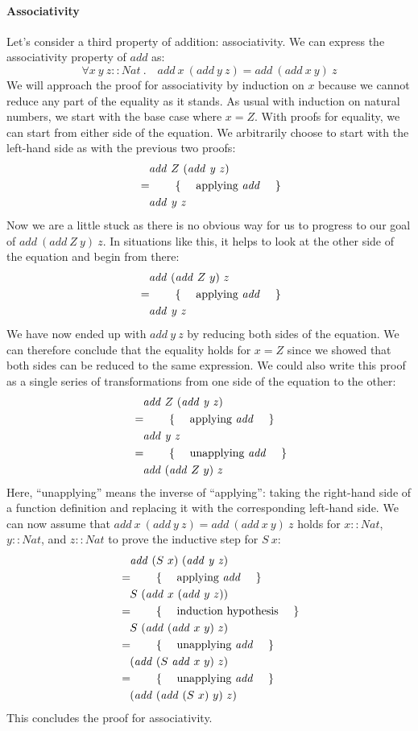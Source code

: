 \paragraph{Associativity} Let's consider a third property of addition: associativity. We can express the associativity property of $\mathit{add}$ as:
\begin{displaymath}
\forall x~y~z :: \mathit{Nat}~.\quad \mathit{add}~x~(\mathit{add~y~z}) = \mathit{add}~(\mathit{add}~x~y)~z
\end{displaymath}
We will approach the proof for associativity by induction on $x$ because we cannot reduce any part of the equality as it stands. As usual with induction on natural numbers, we start with the base case where $x = Z$. With proofs for equality, we can start from either side of the equation. We arbitrarily choose to start with the left-hand side as with the previous two proofs:
\begin{align*}
&\quad \mathit{add}~Z~(\mathit{add~y~z})\\
&=\qquad\text{\{\quad\ applying $\mathit{add}$ \quad\}}\\
&\quad \mathit{add~y~z}
\end{align*}
Now we are a little stuck as there is no obvious way for us to progress to our goal of $\mathit{add}~(\mathit{add}~Z~y)~z$. In situations like this, it helps to look at the other side of the equation and begin from there:
\begin{align*}
&\quad \mathit{add}~(\mathit{add}~Z~y)~z\\
&=\qquad\text{\{\quad\ applying $\mathit{add}$ \quad\}}\\
&\quad \mathit{add~y~z}
\end{align*}
We have now ended up with $\mathit{add~y~z}$ by reducing both sides of the equation. We can therefore conclude that the equality holds for $x = Z$ since we showed that both sides can be reduced to the same expression. We could also write this proof as a single series of transformations from one side of the equation to the other:
\begin{align*}
&\quad \mathit{add}~Z~(\mathit{add~y~z})\\
&=\qquad\text{\{\quad\ applying $\mathit{add}$ \quad\}}\\
&\quad \mathit{add~y~z}\\
&=\qquad\text{\{\quad\ unapplying $\mathit{add}$ \quad\}}\\
&\quad \mathit{add}~(\mathit{add}~Z~y)~z
\end{align*}
Here, ``unapplying'' means the inverse of ``applying'': taking the right-hand side of a function definition and replacing it with the corresponding left-hand side. We can now assume that $\mathit{add}~x~(\mathit{add~y~z}) = \mathit{add}~(\mathit{add}~x~y)~z$ holds for $x :: Nat$, $y :: Nat$, and $z :: Nat$ to prove the inductive step for $S~x$:
\begin{align*}
&\quad \mathit{add}~(S~x)~(\mathit{add~y~z})\\
&=\qquad\text{\{\quad\ applying $\mathit{add}$ \quad\}}\\
&\quad S~(\mathit{add}~x~(\mathit{add}~y~z))\\
&=\qquad\text{\{\quad\ induction hypothesis \quad\}}\\
&\quad S~(\mathit{add}~(\mathit{add}~x~y)~z)\\
&=\qquad\text{\{\quad\ unapplying $\mathit{add}$ \quad\}}\\
&\quad (\mathit{add}~(S~\mathit{add}~x~y)~z)\\
&=\qquad\text{\{\quad\ unapplying $\mathit{add}$ \quad\}}\\
&\quad (\mathit{add}~(\mathit{add}~(S~x)~y)~z)
\end{align*}
This concludes the proof for associativity.

